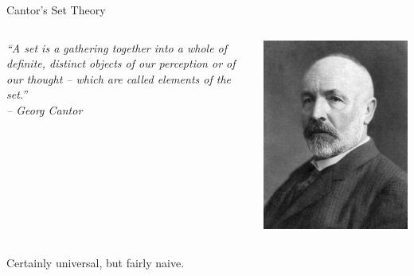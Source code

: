 \documentclass{beamer}
\begin{document}
\begin{frame}{Cantor's Set Theory}
	\begin{columns}[c,onlytextwidth]
	 \begin{column}{.70\textwidth}
		\textit{``A set is a gathering together into a whole of definite, distinct objects of our perception or of our thought -- which are called elements of the set.''\nocite{cantor_set}\\\hfill-- Georg Cantor}
	 \end{column}
	 \begin{column}{.25\textwidth}
		\includegraphics[width=\textwidth]{img/cantor.jpg}
	 \end{column}
	\end{columns}
	\vspace{\baselineskip}
	\pause
	\centerline{\alert{Certainly universal, but fairly naive.}}
\end{frame}
\end{document}
